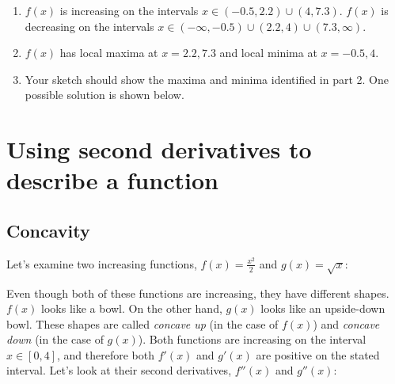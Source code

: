 \begin{Answer}
\begin{enumerate}
	\item $f(x)$ is increasing on the intervals $x\in (-0.5, 2.2)\cup(4, 7.3)$. 
	$f(x)$ is decreasing on the intervals $x\in (-\infty, -0.5)\cup(2.2, 4)\cup(
	7.3, \infty)$. 
	\item $f(x)$ has local maxima at $x = 2.2, 7.3$ and local minima at $x=-0.5, 
	4$. 
	\item Your sketch should show the maxima and minima identified in part 2. One 
	possible solution is shown below.
\end{enumerate}
\end{Answer}	

\section{Using second derivatives to describe a function}
\subsection{Concavity}
Let's examine two increasing functions, $f(x) = \frac{x^2}{2}$ and $g(x) = 
\sqrt{x}$:
\begin{figure}
\centering
{}
\end{figure}

Even though both of these functions are increasing, they have different shapes. 
$f(x)$ looks like a bowl. On the other hand, $g(x)$ looks like an upside-down 
bowl. These shapes are called \textit{concave up} (in the case of $f(x)$) and 
\textit{concave down} (in the case of $g(x)$). Both functions are increasing on 
the interval $x \in [0, 4]$, and therefore both $f'(x)$ and $g'(x)$ are 
positive on the stated interval. Let's look at their second derivatives, $f''(x
)$ and $g''(x)$:

